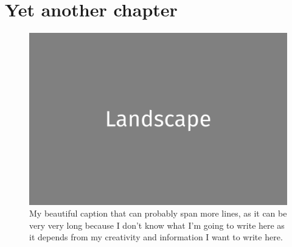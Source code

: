 \documentclass[a4paper,twoside]{book}
\newcommand{\blankpage}{\newpage\hbox{}\thispagestyle{empty}\newpage}
\begin{document}
\blankpage


\chapter*{Yet another chapter}

\blankpage

\clearpage

\begin{figure}[H]
	\includegraphics[width=\textwidth]{landscape.png}
	\caption{My beautiful caption that can probably span more lines, as it can be very very long because I don't know what I'm going to write here as it depends from my creativity and information I want to write here.}
\end{figure}

\clearpage
\end{document}
